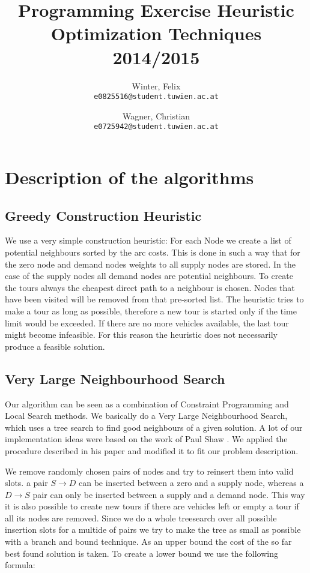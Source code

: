 \documentclass[a4paper]{scrartcl}
\author{
  Winter, Felix\\
  \texttt{e0825516@student.tuwien.ac.at}
  \and
  Wagner, Christian\\
  \texttt{e0725942@student.tuwien.ac.at}
}
\title{Programming Exercise Heuristic Optimization Techniques 2014/2015}
\begin{document}
\setlength{\abovedisplayskip}{0pt}
\setlength{\belowdisplayskip}{0pt}

\begingroup
 \makeatletter
 \maketitle
\endgroup

\section{Description of the algorithms}

\subsection{Greedy Construction Heuristic}

We use a very simple construction heuristic: For each Node we create a list of potential neighbours sorted by the arc costs.
This is done in such a way that for the zero node and demand nodes weights to all supply nodes are stored. In the case of the supply
nodes all demand nodes are potential neighbours.
To create the tours always the cheapest direct path to a neighbour is chosen. Nodes that have been visited will be removed from that
pre-sorted list. The heuristic tries to make a tour as long as possible, therefore a new tour is started only if the time limit would be exceeded.
If there are no more vehicles available, the last tour might become infeasible. For this reason the heuristic does not necessarily
produce a feasible solution.

\subsection{Very Large Neighbourhood Search}

Our algorithm can be seen as a combination of Constraint Programming and Local Search methods. We basically do a Very Large Neighbourhood Search, which uses a tree search to find good neighbours of a given solution.
A lot of our implementation ideas were based on the work of Paul Shaw \cite{shaw1998using}. We applied the procedure described in his paper and modified it to fit our problem description.

We remove randomly chosen pairs of nodes and try to reinsert them into valid slots. a pair $S \rightarrow D$ can be inserted between a zero and a supply node, whereas a $D \rightarrow S$ pair can only be inserted between a supply and a demand node. This way it is also possible to create new tours if there are vehicles left or empty a tour if all its nodes are removed. Since we do a whole treesearch over all possible insertion slots for a multide of pairs we try to make the tree as small as possible with a branch and bound technique.
As an upper bound the cost of the so far best found solution is taken. To create a lower bound we use the following formula:
\end{document}
